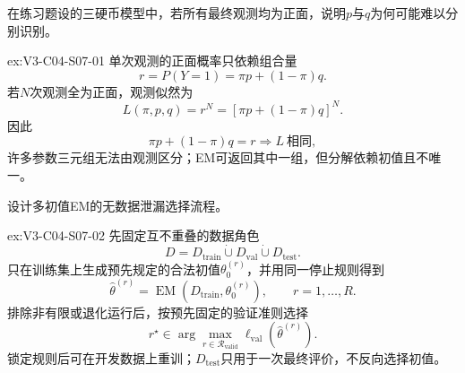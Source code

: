\begin{SLChapterExercisePairSection}
\begin{exercise}\label{ex:V3-C04-S07-01}
在练习题设的三硬币模型中，若所有最终观测均为正面，说明$p$与$q$为何可能难以分别识别。
\end{exercise}
\ifSLFullEdition
{}\label{sol:V3-C04-S07-01}
\begin{chapterexercisesolution}{ex:V3-C04-S07-01}
单次观测的正面概率只依赖组合量
\[
r=P(Y=1)=\pi p+(1-\pi)q.
\]
若$N$次观测全为正面，观测似然为
\[
L(\pi,p,q)=r^N
=\left[\pi p+(1-\pi)q\right]^N.
\]
因此
\[
\pi p+(1-\pi)q=r
\Longrightarrow
L\ \text{相同},
\]
许多参数三元组无法由观测区分；EM可返回其中一组，但分解依赖初值且不唯一。
\end{chapterexercisesolution}
\fi

\begin{exercise}\label{ex:V3-C04-S07-02}
设计多初值EM的无数据泄漏选择流程。
\end{exercise}
\ifSLFullEdition
{}\label{sol:V3-C04-S07-02}
\begin{chapterexercisesolution}{ex:V3-C04-S07-02}
先固定互不重叠的数据角色
\[
D=D_{\mathrm{train}}\mathbin{\dot\cup}D_{\mathrm{val}}
\mathbin{\dot\cup}D_{\mathrm{test}}.
\]
只在训练集上生成预先规定的合法初值$\theta_0^{(r)}$，并用同一停止规则得到
\[
\widehat\theta^{(r)}=\operatorname{EM}(D_{\mathrm{train}},\theta_0^{(r)}),
\qquad r=1,\ldots,R.
\]
排除非有限或退化运行后，按预先固定的验证准则选择
\[
r^\star\in\arg\max_{r\in\mathcal R_{\mathrm{valid}}}
\ell_{\mathrm{val}}(\widehat\theta^{(r)}).
\]
锁定规则后可在开发数据上重训；$D_{\mathrm{test}}$只用于一次最终评价，不反向选择初值。
\end{chapterexercisesolution}
\fi

\end{SLChapterExercisePairSection}
